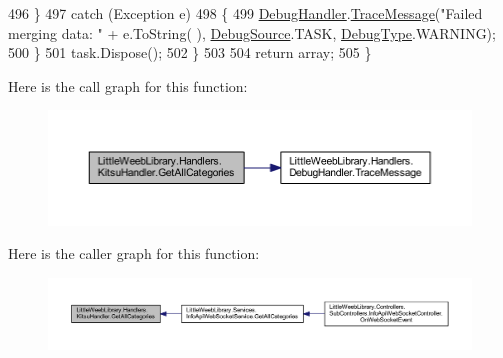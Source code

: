 \begin{DoxyCode}
496                 \}
497                 \textcolor{keywordflow}{catch} (Exception e)
498                 \{
499                     \mbox{\hyperlink{class_little_weeb_library_1_1_handlers_1_1_kitsu_handler_a6d3c55fa5eee15320845c2d902c96882}{DebugHandler}}.\mbox{\hyperlink{interface_little_weeb_library_1_1_handlers_1_1_i_debug_handler_a2e405bc3492e683cd3702fae125221bc}{TraceMessage}}(\textcolor{stringliteral}{"Failed merging data: "} + e.ToString(
      ), \mbox{\hyperlink{namespace_little_weeb_library_1_1_handlers_a2a6ca0775121c9c503d58aa254d292be}{DebugSource}}.TASK, \mbox{\hyperlink{namespace_little_weeb_library_1_1_handlers_ab66019ed40462876ec4e61bb3ccb0a62}{DebugType}}.WARNING);
500                 \}
501                 task.Dispose();
502             \}
503 
504             \textcolor{keywordflow}{return} array;
505         \}
\end{DoxyCode}
Here is the call graph for this function\+:\nopagebreak
\begin{figure}[H]
\begin{center}
\leavevmode
\includegraphics[width=350pt]{class_little_weeb_library_1_1_handlers_1_1_kitsu_handler_ae329f7e735a6abee2734bbbd13d121b2_cgraph}
\end{center}
\end{figure}
Here is the caller graph for this function\+:\nopagebreak
\begin{figure}[H]
\begin{center}
\leavevmode
\includegraphics[width=350pt]{class_little_weeb_library_1_1_handlers_1_1_kitsu_handler_ae329f7e735a6abee2734bbbd13d121b2_icgraph}
\end{center}
\end{figure}
\mbox{\label{class_little_weeb_library_1_1_handlers_1_1_kitsu_handler_a27b4c1e9d11ba03420fbd13166e0f95b}} 

